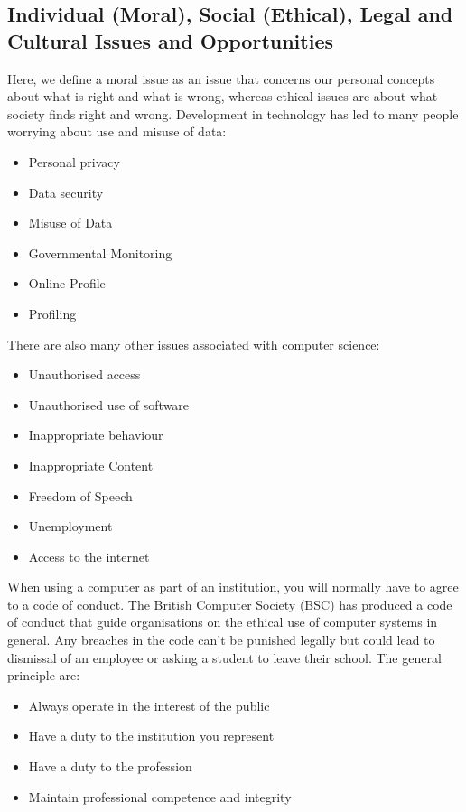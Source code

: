 \subsection{Individual (Moral), Social (Ethical), Legal and Cultural Issues and Opportunities}
  \noindent
  Here, we define a moral issue as an issue that concerns our personal concepts about what is right and what is wrong, whereas ethical issues are about what society finds right and wrong. Development in technology has led to many people worrying about use and misuse of data:
  \begin{itemize}
    \setlength{\itemsep}{0em}
    \item Personal privacy
    \item Data security
    \item Misuse of Data
    \item Governmental Monitoring
    \item Online Profile
    \item Profiling
  \end{itemize}
  There are also many other issues associated with computer science:
  \begin{itemize}
    \setlength{\itemsep}{0em}
    \item Unauthorised access
    \item Unauthorised use of software
    \item Inappropriate behaviour
    \item Inappropriate Content
    \item Freedom of Speech
    \item Unemployment
    \item Access to the internet
  \end{itemize}
  When using a computer as part of an institution, you will normally have to agree to a code of conduct. The British Computer Society (BSC) has produced a code of conduct that guide organisations on the ethical use of computer systems in general. Any breaches in the code can't be punished legally but could lead to dismissal of an employee or asking a student to leave their school. The general principle are:
  \begin{itemize}
    \setlength{\itemsep}{0em}
    \item Always operate in the interest of the public
    \item Have a duty to the institution you represent
    \item Have a duty to the profession
    \item Maintain professional competence and integrity
  \end{itemize}
